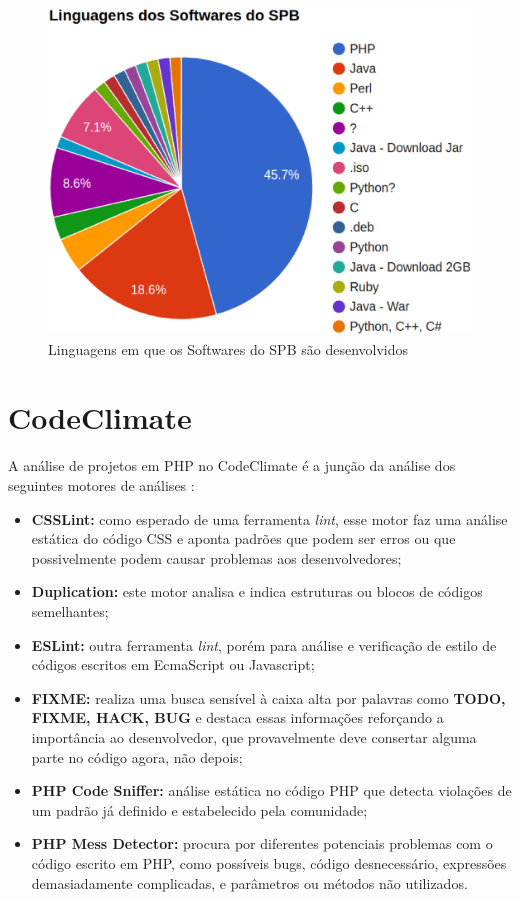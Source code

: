 \begin{figure}[!htb]
	\centering
    \includegraphics[keepaspectratio=true,scale=0.5]
    {figuras/linguagens_softwares_spb.eps}
  \caption{Linguagens em que os Softwares do SPB são desenvolvidos}
  \label{fig:linguagens_softwares_spb}
\end{figure}

\newpage

\section{CodeClimate}

A análise de projetos em PHP no CodeClimate é a junção da análise dos seguintes
motores de análises \cite{enginesCodeClimate}:

\begin{itemize}
  \item \textbf{CSSLint:} como esperado de uma ferramenta \textit{lint}, esse
	motor faz uma análise estática do código CSS e aponta padrões que podem ser
	erros ou que possivelmente podem causar problemas aos desenvolvedores;
	\item \textbf{Duplication:} este motor analisa e indica estruturas ou blocos
	de códigos semelhantes;
	\item \textbf{ESLint:} outra ferramenta \textit{lint}, porém para análise e
	verificação de estilo de códigos escritos em EcmaScript ou Javascript;
	\item \textbf{FIXME:} realiza uma busca sensível à caixa alta por palavras
	como \textbf{TODO, FIXME, HACK, BUG} e destaca essas informações reforçando a
	importância ao desenvolvedor, que provavelmente deve consertar alguma parte no
	código agora, não depois;
	\item \textbf{PHP Code Sniffer:} análise estática no código PHP que detecta
	violações de um padrão já definido e estabelecido pela comunidade;
	\item \textbf{PHP Mess Detector:} procura por diferentes potenciais problemas
	com o código escrito em PHP, como possíveis bugs, código desnecessário,
	expressões demasiadamente complicadas, e parâmetros ou métodos não utilizados.
\end{itemize}

